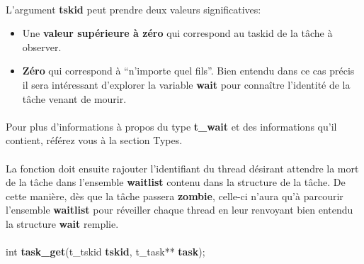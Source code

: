 \documentclass[10pt,a4wide]{article}
\begin{document}
\paragraph{}

L'argument \textbf{tskid} peut prendre deux valeurs significatives:

\begin{itemize}

\item Une \textbf{valeur sup\'erieure \`a z\'ero} qui correspond au taskid de
      la t\^ache \`a observer.

\item \textbf{Z\'ero} qui correspond \`a ``n'importe quel fils''. Bien entendu
      dans ce cas pr\'ecis il sera int\'eressant d'explorer la variable
      \textbf{wait} pour conna\^itre l'identit\'e de la t\^ache venant
      de mourir.

\end{itemize}

\paragraph{}

Pour plus d'informations \`a propos du type \textbf{t\_wait} et des
informations qu'il contient, r\'ef\'erez vous \`a la section Types.

\paragraph{}

La fonction doit ensuite rajouter l'identifiant du thread d\'esirant
attendre la mort de la t\^ache dans l'ensemble \textbf{waitlist} contenu
dans la structure de la t\^ache. De cette mani\`ere, d\`es que la t\^ache
passera \textbf{zombie}, celle-ci n'aura qu'\`a parcourir l'ensemble
\textbf{waitlist} pour r\'eveiller chaque thread en leur renvoyant bien
entendu la structure \textbf{wait} remplie.

\paragraph{}

\hspace{1.5cm}int \textbf{task\_get}(t\_tskid \textbf{tskid},
                                     t\_task** \textbf{task});

\paragraph{}
\end{document}

